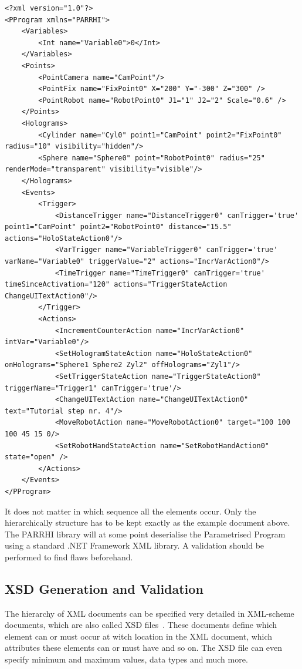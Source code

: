 \begin{lstlisting}
<?xml version="1.0"?>
<PProgram xmlns="PARRHI">
	<Variables>
		<Int name="Variable0">0</Int>
	</Variables>
	<Points>
		<PointCamera name="CamPoint"/>
		<PointFix name="FixPoint0" X="200" Y="-300" Z="300" />
		<PointRobot name="RobotPoint0" J1="1" J2="2" Scale="0.6" />
	</Points>
	<Holograms>
		<Cylinder name="Cyl0" point1="CamPoint" point2="FixPoint0" radius="10" visibility="hidden"/>
		<Sphere name="Sphere0" point="RobotPoint0" radius="25" renderMode="transparent" visibility="visible"/>
	</Holograms>
	<Events>
		<Trigger>
			<DistanceTrigger name="DistanceTrigger0" canTrigger='true' point1="CamPoint" point2="RobotPoint0" distance="15.5" actions="HoloStateAction0"/>
			<VarTrigger name="VariableTrigger0" canTrigger='true' varName="Variable0" triggerValue="2" actions="IncrVarAction0"/>
			<TimeTrigger name="TimeTrigger0" canTrigger='true' timeSinceActivation="120" actions="TriggerStateAction ChangeUITextAction0"/>
		</Trigger>
		<Actions>
			<IncrementCounterAction name="IncrVarAction0" intVar="Variable0"/>
			<SetHologramStateAction name="HoloStateAction0" onHolograms="Sphere1 Sphere2 Zyl2" offHolograms="Zyl1"/>
			<SetTriggerStateAction name="TriggerStateAction0" triggerName="Trigger1" canTrigger='true'/>
			<ChangeUITextAction name="ChangeUITextAction0" text="Tutorial step nr. 4"/>
			<MoveRobotAction name="MoveRobotAction0" target="100 100 100 45 15 0/>
			<SetRobotHandStateAction name="SetRobotHandAction0" state="open" />
		</Actions>
	</Events>
</PProgram>
\end{lstlisting}

It does not matter in which sequence all the elements occur. Only the hierarchically structure has to be kept exactly as the example document above. The PARRHI library will at some point deserialise the Parametrised Program using a standard .NET Framework XML library. A validation should be performed to find flaws beforehand.

\subsection{XSD Generation and Validation}
The hierarchy of XML documents can be specified very detailed in XML-scheme documents, which are also called XSD files~\cite{xsdW3C}. These documents define which element can or must occur at witch location in the XML document, which attributes these elements can or must have and so on. The XSD file can even specify minimum and maximum values, data types and much more.

